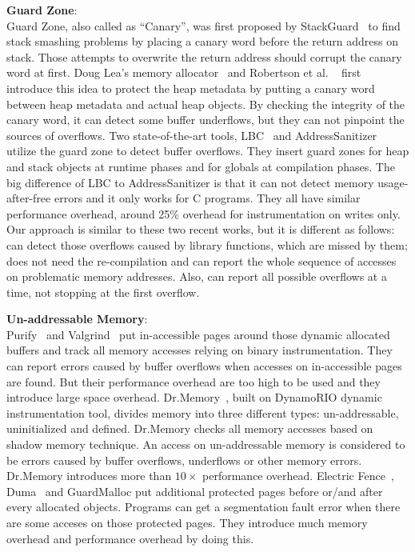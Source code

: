 \textbf{Guard Zone}: \\
Guard Zone, also called as ``Canary'', was first proposed by StackGuard~\cite{StackGuard} to find
stack smashing problems by placing a canary word before the return address on stack. Those attempts to
overwrite the return address should corrupt the canary word at first. 
Doug Lea's memory allocator~\cite{dlmalloc} and Robertson et al. ~\cite{Robertson:2003:RDH:1051937.1051947} first introduce this idea to protect the heap metadata by putting a canary
word between heap metadata and actual heap objects. By checking the integrity of 
the canary word, it can detect some buffer underflows, but they can not pinpoint the sources of overflows.
Two state-of-the-art tools, LBC~\cite{overflow:lbc} and AddressSanitizer~\cite{AddressSanitizer} utilize
the guard zone to detect buffer overflows. 
They insert guard zones for heap and stack objects at runtime phases and for globals at 
compilation phases. The big difference of LBC to AddressSanitizer is that it can not 
detect memory usage-after-free errors and it only works for C programs. 
They all have similar performance overhead, around 
25\% overhead for instrumentation on writes only.  
Our approach is similar to these two recent works, but it is different as follows: 
\doubletake{} can detect those overflows 
caused by library functions, which are missed by them; \doubletake{} does not need the re-compilation 
and can report the whole sequence of accesses on
problematic memory addresses. Also, \doubletake{} can report all possible overflows at a time, not 
stopping at the first overflow. 

\textbf{Un-addressable Memory}: \\
Purify~\cite{overflow:purify} and Valgrind~\cite{overflow:valgrind}
put in-accessible pages around those dynamic allocated buffers and 
track all memory accesses relying on binary instrumentation. 
They can report errors caused by buffer overflows when accesses on in-accessible pages are found.
But their performance overhead are too high to be used and they introduce large space overhead.
Dr.Memory~\cite{overflow:drmemory}, built on DynamoRIO dynamic instrumentation tool, divides memory
into three different types: un-addressable, uninitialized and defined. Dr.Memory checks all memory
accesses based on shadow memory technique. An access on un-addressable memory is considered
to be errors caused by buffer overflows, underflows or other memory errors. Dr.Memory introduces more 
than $10\times$ performance overhead.    
Electric Fence~\cite{electricfence}, Duma~\cite{duma} and GuardMalloc put additional protected pages
before or/and after every allocated objects. Programs can get a segmentation fault error when there
are some acceses on those protected pages. They introduce much memory overhead and performance overhead
by doing this. 
 
